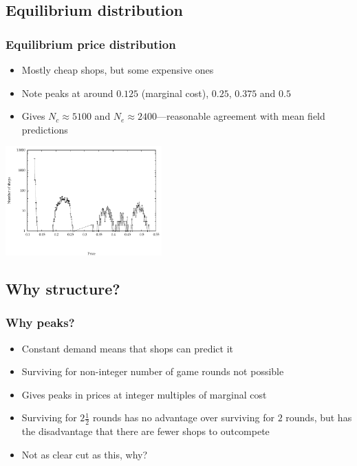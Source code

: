 \documentclass{beamer}
\begin{document}
\subsection{Equilibrium distribution}
\frame
{
  \frametitle{Equilibrium price distribution}
  \begin{minipage}{0.4\textwidth}
  \begin{itemize}
    \setlength{\itemsep}{\baselineskip}
    \item<1-> Mostly cheap shops, but some expensive ones
    \item<2-> Note peaks at around $0.125$ (marginal cost),
      $0.25$, $0.375$ and $0.5$
    \item<3-> Gives $N_c \approx 5100$ and $N_e \approx
      2400$---reasonable agreement with mean field predictions
    \end{itemize}
  \end{minipage}
  \begin{minipage}{0.5\textwidth}
    \begin{center}
      \includegraphics[width=6cm]{03-24-undergrad-project-presentation.figures/shop-price-projection-1}
    \end{center}%
  \end{minipage}
}

\subsection{Why structure?}
\frame
{
  \frametitle{Why peaks?}
  \begin{itemize}
    \setlength{\itemsep}{\baselineskip}
  \item<1-> Constant demand means that shops can predict it
  \item<2-> Surviving for non-integer number of game rounds
    not possible
  \item<3-> Gives peaks in prices at integer multiples of
    marginal cost
  \item<4-> Surviving for $2 \frac{1}{2}$ rounds has no
    advantage over surviving for $2$ rounds, but has the disadvantage
    that there are fewer shops to outcompete
  \item<5-> Not as clear cut as this, why?
  \end{itemize}
}
\end{document}
